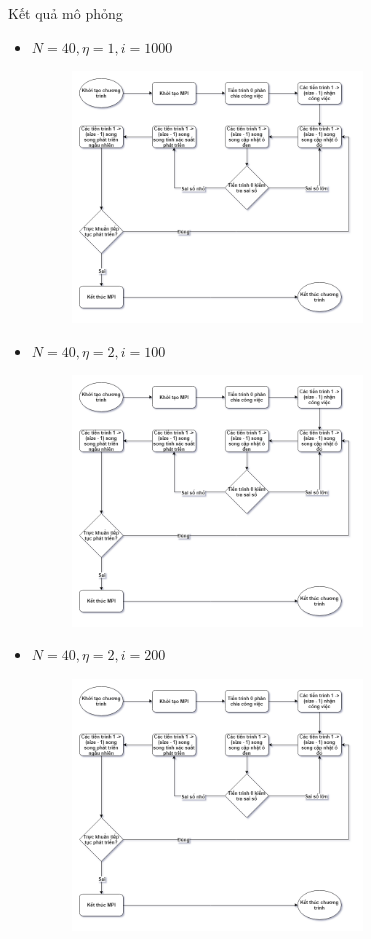 \begin{frame}[allowframebreaks]{Kết quả mô phỏng}
\begin{itemize}
\begin{figure}[H]
    \end{figure}
\end{itemize}
\break
\begin{itemize}
    \item $N = 40, \eta = 1, i = 1000$
    \begin{figure}[H]
        \centering
        \includegraphics[width=77mm]{img/algo-flowchart.png}
    \end{figure}
\end{itemize}
\break
\begin{itemize}
    \item $N = 40, \eta = 2, i = 100$
    \begin{figure}[H]
        \centering
        \includegraphics[width=77mm]{img/algo-flowchart.png}
    \end{figure}
\end{itemize}
\break
\begin{itemize}
    \item $N = 40, \eta = 2, i = 200$
    \begin{figure}[H]
        \centering
        \includegraphics[width=77mm]{img/algo-flowchart.png}

\end{figure}
\end{itemize}
\end{frame}
